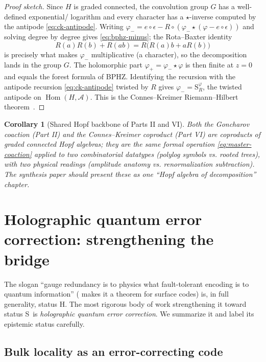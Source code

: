 \documentclass[12pt]{article}
\newtheorem{corollary}[theorem]{Corollary}
\theoremstyle{definition}
\theoremstyle{remark}
\newcommand{\Hom}{\operatorname{Hom}}
\newcommand{\antipode}{\mathrm{S}}
\newcommand{\Ss}{\textsf{S}}
\newcommand{\Hh}{\textsf{H}}
\begin{document}
\begin{proof}[Proof sketch]
Since $H$ is graded connected, the convolution group $G$ has a well-defined exponential/
logarithm and every character has a $\star$-inverse computed by the antipode
\eqref{eq:ck-antipode}. Writing $\varphi_-=e\circ\epsilon - R\circ(\varphi_-\star(\varphi-e\circ\epsilon))$
and solving degree by degree gives \eqref{eq:bphz-minus}; the Rota--Baxter
identity~\cite{RotaBaxter}
\[
R(a)R(b)+R(ab)=R\bigl(R(a)b+aR(b)\bigr)
\]
is precisely what makes $\varphi_-$ multiplicative (a character), so the decomposition
lands in the group $G$. The holomorphic part $\varphi_+=\varphi_-\star\varphi$ is then
finite at $z=0$ and equals the forest formula of BPHZ. Identifying the recursion with
the antipode recursion \eqref{eq:ck-antipode} twisted by $R$ gives
$\varphi_-=\antipode_R^{\varphi}$, the twisted antipode on $\Hom(H,\mathcal A)$. This is
the Connes--Kreimer Riemann--Hilbert theorem~\cite{ConnesKreimer}.
\end{proof}

\begin{corollary}[Shared Hopf backbone of Parts II and VI]
\label{cor:shared-hopf}
Both the Goncharov coaction (Part II) and the Connes--Kreimer coproduct (Part VI) are
coproducts of graded connected Hopf algebras; they are the same formal operation
\eqref{eq:master-coaction} applied to two combinatorial datatypes (polylog symbols vs.
rooted trees), with two physical readings (amplitude anatomy vs. renormalization
subtraction). The synthesis paper should present these as one ``Hopf algebra of
decomposition'' chapter.
\end{corollary}

\section{Holographic quantum error correction: strengthening the bridge}
\label{sec:holographic}

The slogan ``gauge redundancy is to physics what fault-tolerant encoding is to quantum
information'' ( makes it a theorem for surface codes) is, in
full generality, status \Hh. The most rigorous body of work strengthening it toward
status \Ss\ is \emph{holographic quantum error correction}. We summarize it and label
its epistemic status carefully.

\subsection{Bulk locality as an error-correcting code}
\end{document}
